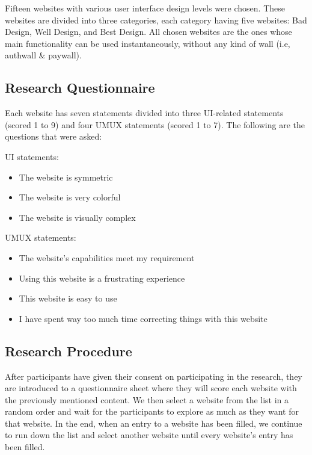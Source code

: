 \documentclass[conference]{IEEEtran}
\begin{document}
Fifteen websites with various user interface design levels were chosen. These websites are divided into three categories, each category having five websites: Bad Design, Well Design, and Best Design. All chosen websites are the ones whose main functionality can be used instantaneously, without any kind of wall (i.e, authwall \& paywall).

\subsection{Research Questionnaire}

Each website has seven statements divided into three UI-related statements (scored 1 to 9) and four UMUX statements (scored 1 to 7). The following are the questions that were asked:

UI statements:

\begin{itemize}
    \item The website is symmetric
    \item The website is very colorful
    \item The website is visually complex
\end{itemize}

UMUX statements:

\begin{itemize}
    \item The website's capabilities meet my requirement
    \item Using this website is a frustrating experience
    \item This website is easy to use
    \item I have spent way too much time correcting things with this website
\end{itemize}

\subsection{Research Procedure}

After participants have given their consent on participating in the research, they are introduced to a questionnaire sheet where they will score each website  with the previously mentioned content. We then select a website from the list in a random order and wait for the participants to explore as much as they want for that website. In the end, when an entry to a website has been filled, we continue to run down the list and select another website until every website's entry has been filled.
\end{document}
